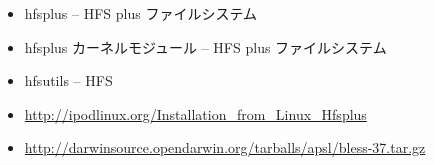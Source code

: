 \documentclass[cjk,dvipdfmx]{beamer}
\begin{document}
\begin{frame}
 \frametitle{}
\begin{itemize}
 \item hfsplus -- HFS plus ファイルシステム
 \item hfsplus カーネルモジュール -- HFS plus ファイルシステム
 \item hfsutils -- HFS 
 \item \url{http://ipodlinux.org/Installation_from_Linux_Hfsplus}
 \item \url{http://darwinsource.opendarwin.org/tarballs/apsl/bless-37.tar.gz}
\end{itemize}
\end{frame}
\end{document}
